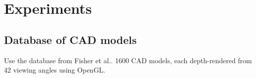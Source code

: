 \documentclass[10pt,a4paper, twocolumn]{article}
\makeatletter
\newcommand*{\ea}{et al.\@\xspace}
\newcommand{\prob}{Pr}
\newcommand{\rgbdimage}{\mathbf{I}}
\newcommand{\imregion}{\mathcal{R}}
\makeatother
\begin{document}


\section{Experiments}

\subsection{Database of CAD models}
Use the database from Fisher \ea \cite{fisher-siggraphasia-2012}.
1600 CAD models, each depth-rendered from 42 viewing angles using OpenGL.


%



\end{document}
